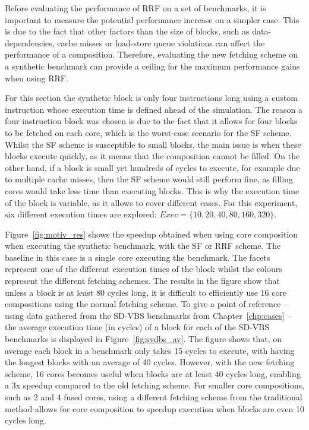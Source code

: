 Before evaluating the performance of RRF on a set of benchmarks, it is important to measure the potential performance increase on a simpler case.
This is due to the fact that other factors than the size of blocks, such as data-dependencies, cache misses or load-store queue violations can affect the performance of a composition.
Therefore, evaluating the new fetching scheme on a synthetic benchmark can provide a ceiling for the maximum performance gains when using RRF.

For this section the synthetic block is only four instructions long using a custom instruction whose execution time is defined ahead of the simulation.
The reason a four instruction block was chosen is due to the fact that it allows for four blocks to be fetched on each core, which is the worst-case scenario for the SF scheme.
Whilst the SF scheme is susceptible to small blocks, the main issue is when these blocks execute quickly, as it means that the composition cannot be filled.
On the other hand, if a block is small yet hundreds of cycles to execute, for example due to multiple cache misses, then the SF scheme would still perform fine, as filling cores would take less time than executing blocks.
This is why the execution time of the block is variable, as it allows to cover different cases.
For this experiment, six different execution times are explored: $Exec=\{10,20,40,80,160,320\}$.

Figure~\ref{fig:motiv_res} shows the speedup obtained when using core composition when executing the synthetic benchmark, with the SF or RRF scheme.
The baseline in this case is a single core executing the benchmark.
The facets represent one of the different execution times of the block whilst the colours represent the different fetching schemes.
The results in the figure show that unless a block is at least 80 cycles long, it is difficult to efficiently use 16 core compositions using the normal fetching scheme.
To give a point of reference -- using data gathered from the SD-VBS benchmarks from Chapter~\ref{chp:cases} -- the average execution time (in cycles) of a block for each of the SD-VBS benchmarks is displayed in Figure~\ref{fig:svdbs_av}.
The figure shows that, on average each block in a benchmark only takes 15 cycles to execute, with  having the longest blocks with an average of 40 cycles.
However, with the new fetching scheme, 16 cores becomes useful when blocks are at least 40 cycles long, enabling a 3x speedup compared to the old fetching scheme.
For smaller core compositions, such as 2 and 4 fused cores, using a different fetching scheme from the traditional method allows for core composition to speedup execution when blocks are even 10 cycles long.
